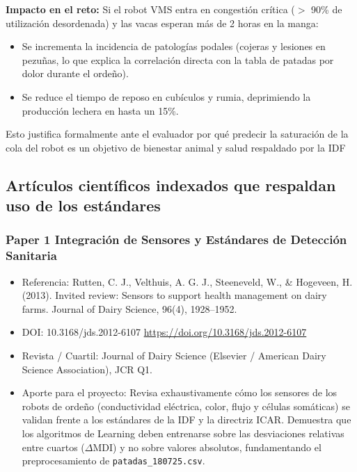 \textbf{Impacto en el reto:} Si el robot VMS entra en congestión crítica ($>$ 90\% de utilización desordenada) y las vacas esperan más de 2 horas en la manga:

\begin{itemize}
  \item Se incrementa la incidencia de patologías podales (cojeras y lesiones en pezuñas, lo que explica la correlación directa con la tabla de patadas por dolor durante el ordeño).
  \item Se reduce el tiempo de reposo en cubículos y rumia, deprimiendo la producción lechera en hasta un 15\%.
\end{itemize}

Esto justifica formalmente ante el evaluador por qué predecir la saturación de la cola del robot es un objetivo de bienestar animal y salud respaldado por la IDF

\subsection{Artículos científicos indexados que respaldan uso de los estándares}

\subsubsection*{Paper 1 Integración de Sensores y Estándares de Detección Sanitaria}

\begin{itemize}
  \item Referencia: Rutten, C. J., Velthuis, A. G. J., Steeneveld, W., \& Hogeveen, H. (2013). Invited review: Sensors to support health management on dairy farms. Journal of Dairy Science, 96(4), 1928–1952.
  \item DOI: 10.3168/jds.2012-6107 \url{https://doi.org/10.3168/jds.2012-6107}
  \item Revista / Cuartil: Journal of Dairy Science (Elsevier / American Dairy Science Association), JCR Q1.
  \item Aporte para el proyecto: Revisa exhaustivamente cómo los sensores de los robots de ordeño (conductividad eléctrica, color, flujo y células somáticas) se validan frente a los estándares de la IDF y la directriz ICAR. Demuestra que los algoritmos de Learning deben entrenarse sobre las desviaciones relativas entre cuartos ($\Delta$MDI) y no sobre valores absolutos, fundamentando el preprocesamiento de \texttt{patadas\_180725.csv}.
\end{itemize}

